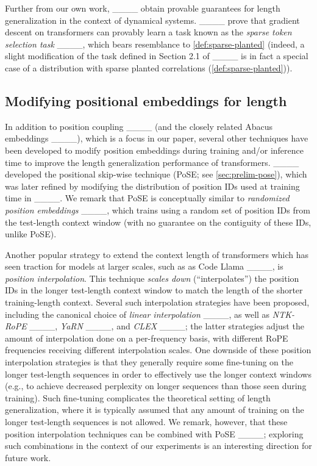 Further from our own work, ____ obtain provable guarantees for length generalization in the context of dynamical systems. ____ prove that gradient descent on transformers can provably learn a task known as the \emph{sparse token selection task} ____, which bears resemblance to \cref{def:sparse-planted} (indeed, a slight modification of the task defined in Section 2.1 of ____ is in fact a special case of a distribution with sparse planted correlations (\cref{def:sparse-planted})). 




\subsection{Modifying positional embeddings for length \generalization}
\label{sec:related-posids}
In addition to position coupling ____ (and the closely related Abacus embeddings  ____), which is a focus in our paper, several other techniques have been developed to modify position embeddings during training and/or inference time to improve the length generalization performance of transformers. ____ developed the positional skip-wise technique (PoSE; see \cref{sec:prelim-pose}), which was later refined by modifying the distribution of position IDs used at training time in ____. We remark that PoSE is conceptually similar to \emph{randomized position embeddings} ____, which trains using a random set of position IDs from the test-length context window (with no guarantee on the contiguity of these IDs, unlike PoSE).

Another popular strategy to extend the context length of transformers which has seen traction for models at larger scales, such as as Code Llama ____, is \emph{position interpolation}. This technique \emph{scales down} (``interpolates'') the position IDs in the longer test-length context window to match the length of the shorter training-length context. Several such interpolation strategies have been proposed, including the canonical choice of \emph{linear interpolation} ____, as well as \emph{NTK-RoPE} ____, \emph{YaRN} ____, and \emph{CLEX} ____; the latter strategies adjust the amount of interpolation done on a per-frequency basis, with different RoPE frequencies receiving different interpolation scales. One downside of these position interpolation strategies is that they generally require some fine-tuning on the longer test-length sequences in order to effectively use the longer context windows (e.g., to achieve decreased perplexity on longer sequences than those seen during training). Such fine-tuning complicates the theoretical setting of length generalization, where it is typically assumed that any amount of training on the longer test-length sequences is not allowed. We remark, however, that these position interpolation techniques can be combined with PoSE ____; exploring such combinations in the context of our experiments is an interesting direction for future work.

